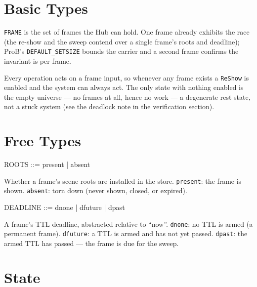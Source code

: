 \documentclass[a4paper,10pt,fleqn]{article}
\begin{document}
\section{Basic Types}

\begin{zed}
  [FRAME]
\end{zed}

\texttt{FRAME} is the set of frames the Hub can hold. One frame already exhibits
the race (the re-show and the sweep contend over a single frame's roots and
deadline); ProB's \texttt{DEFAULT\_SETSIZE} bounds the carrier and a second frame
confirms the invariant is per-frame.

Every operation acts on a frame input, so whenever any frame exists a
\texttt{ReShow} is enabled and the system can always act. The only state with
nothing enabled is the empty universe --- no frames at all, hence no work --- a
degenerate rest state, not a stuck system (see the deadlock note in the
verification section).

\section{Free Types}

\begin{zed}
  ROOTS ::= present | absent
\end{zed}

Whether a frame's scene roots are installed in the store. \texttt{present}: the
frame is shown. \texttt{absent}: torn down (never shown, closed, or expired).

\begin{zed}
  DEADLINE ::= dnone | dfuture | dpast
\end{zed}

A frame's TTL deadline, abstracted relative to ``now''. \texttt{dnone}: no TTL is
armed (a permanent frame). \texttt{dfuture}: a TTL is armed and has not yet passed.
\texttt{dpast}: the armed TTL has passed --- the frame is due for the sweep.

\section{State}
\end{document}
